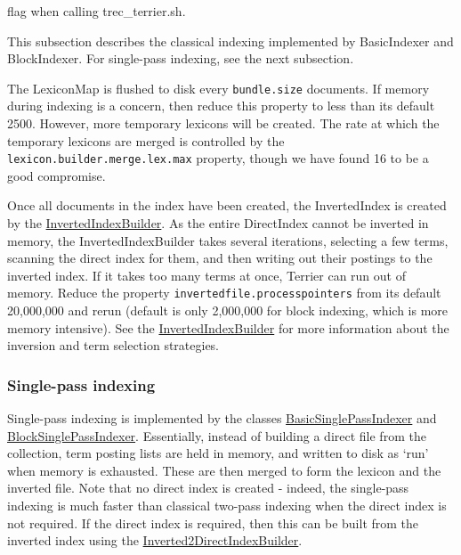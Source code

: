 flag when calling trec\_terrier.sh.

This subsection describes the classical indexing implemented by
BasicIndexer and BlockIndexer. For single-pass indexing, see the next
subsection.

The LexiconMap is flushed to disk every \texttt{bundle.size} documents.
If memory during indexing is a concern, then reduce this property to
less than its default 2500. However, more temporary lexicons will be
created. The rate at which the temporary lexicons are merged is
controlled by the \texttt{lexicon.builder.merge.lex.max} property,
though we have found 16 to be a good compromise.

Once all documents in the index have been created, the InvertedIndex is
created by the
\href{javadoc/org/terrier/structures/indexing/classical/InvertedIndexBuilder.html}{InvertedIndexBuilder}.
As the entire DirectIndex cannot be inverted in memory, the
InvertedIndexBuilder takes several iterations, selecting a few terms,
scanning the direct index for them, and then writing out their postings
to the inverted index. If it takes too many terms at once, Terrier can
run out of memory. Reduce the property
\texttt{invertedfile.processpointers} from its default 20,000,000 and
rerun (default is only 2,000,000 for block indexing, which is more
memory intensive). See the
\href{javadoc/org/terrier/structures/indexing/classical/InvertedIndexBuilder.html}{InvertedIndexBuilder}
for more information about the inversion and term selection strategies.

\subsubsection{Single-pass indexing}\label{single-pass-indexing}

Single-pass indexing is implemented by the classes
\href{javadoc/org/terrier/structures/indexing/singlepass/BasicSinglePassIndexer.html}{BasicSinglePassIndexer}
and
\href{javadoc/org/terrier/structures/indexing/singlepass/BasicSinglePassIndexer.html}{BlockSinglePassIndexer}.
Essentially, instead of building a direct file from the collection, term
posting lists are held in memory, and written to disk as `run' when
memory is exhausted. These are then merged to form the lexicon and the
inverted file. Note that no direct index is created - indeed, the
single-pass indexing is much faster than classical two-pass indexing
when the direct index is not required. If the direct index is required,
then this can be built from the inverted index using the
\href{javadoc/org/terrier/structures/indexing/singlepass/Inverted2DirectIndexBuilder.html}{Inverted2DirectIndexBuilder}.

